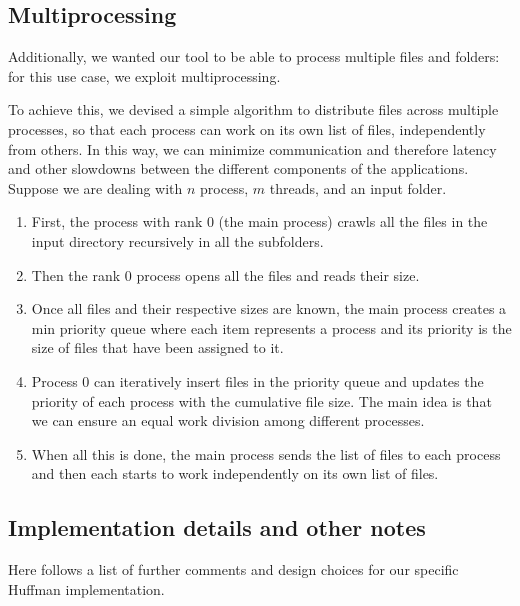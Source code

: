 \subsection{Multiprocessing}

Additionally, we wanted our tool to be able to process multiple files and folders: for this use case, we exploit multiprocessing.

To achieve this, we devised a simple algorithm to distribute files across multiple processes, so that each process can work on its own list of files, independently from others. In this way, we can minimize communication and therefore latency and other slowdowns between the different components of the applications. Suppose we are dealing with \(n\) process, \(m\) threads, and an input folder.

\begin{enumerate}
	\item First, the process with rank 0 (the main process) crawls all the files in the input directory recursively in all the subfolders.
	\item Then the rank 0 process opens all the files and reads their size.
	\item Once all files and their respective sizes are known, the main process creates a min priority queue where each item represents a process and its priority is the size of files that have been assigned to it.
	\item Process 0 can iteratively insert files in the priority queue and updates the priority of each process with the cumulative file size. The main idea is that we can ensure an equal work division among different processes.
	\item When all this is done, the main process sends the list of files to each process and then each starts to work independently on its own list of files.
\end{enumerate}

\subsection{Implementation details and other notes}
Here follows a list of further comments and design choices for our specific Huffman implementation. 

